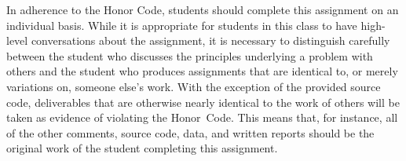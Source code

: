 In adherence to the Honor Code, students should complete this assignment on an individual basis. While it is appropriate
for students in this class to have high-level conversations about the assignment, it is necessary to distinguish
carefully between the student who discusses the principles underlying a problem with others and the student who produces
assignments that are identical to, or merely variations on, someone else's work.  With the exception of the provided
source code, deliverables that are otherwise nearly identical to the work of others will be taken as evidence of
violating the \mbox{Honor Code}. This means that, for instance, all of the other comments, source code, data, and
written reports should be the original work of the student completing this assignment.



